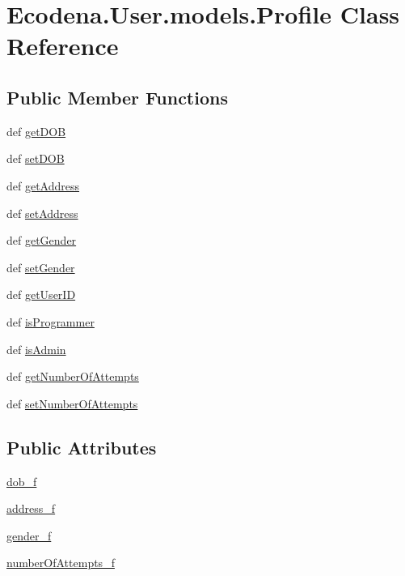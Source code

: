 \hypertarget{class_ecodena_1_1_user_1_1models_1_1_profile}{
\section{Ecodena.User.models.Profile Class Reference}
\label{d2/de8/class_ecodena_1_1_user_1_1models_1_1_profile}
}
\subsection*{Public Member Functions}
\begin{DoxyCompactItemize}
\item 
def \hyperlink{class_ecodena_1_1_user_1_1models_1_1_profile_aa3fa8f1096c2e8021d3578cde996d0d3}{getDOB}
\item 
def \hyperlink{class_ecodena_1_1_user_1_1models_1_1_profile_a1c2cd895532464835322c8817b84127b}{setDOB}
\item 
def \hyperlink{class_ecodena_1_1_user_1_1models_1_1_profile_adaf43b36f5eb3994724afcf4f0747b5a}{getAddress}
\item 
def \hyperlink{class_ecodena_1_1_user_1_1models_1_1_profile_a0b1ce69feddc9f286e7a5db8ec2d3c70}{setAddress}
\item 
def \hyperlink{class_ecodena_1_1_user_1_1models_1_1_profile_ae3c89f787c9d05d936aa9f546f3000d8}{getGender}
\item 
def \hyperlink{class_ecodena_1_1_user_1_1models_1_1_profile_ad672f792bcdbdea6cfeffc42d40c6a77}{setGender}
\item 
def \hyperlink{class_ecodena_1_1_user_1_1models_1_1_profile_a65c1e9ebd3546e0bb3a5d9406b42c447}{getUserID}
\item 
def \hyperlink{class_ecodena_1_1_user_1_1models_1_1_profile_aa39c57dab77961ae9824af3fc8826063}{isProgrammer}
\item 
def \hyperlink{class_ecodena_1_1_user_1_1models_1_1_profile_a3891c38be9cd69cbeaf70ebbb6f64f06}{isAdmin}
\item 
def \hyperlink{class_ecodena_1_1_user_1_1models_1_1_profile_ad1309d4e82559e7d169721375df7eb47}{getNumberOfAttempts}
\item 
def \hyperlink{class_ecodena_1_1_user_1_1models_1_1_profile_aad5024beeaa9c50b58d9d00c64b0c776}{setNumberOfAttempts}
\end{DoxyCompactItemize}
\subsection*{Public Attributes}
\begin{DoxyCompactItemize}
\item 
\hyperlink{class_ecodena_1_1_user_1_1models_1_1_profile_aa1c680ce4e197bcf65844505c0ab5784}{dob\_\-f}
\item 
\hyperlink{class_ecodena_1_1_user_1_1models_1_1_profile_a5229e8c6e894361d0390b975d4cbdee9}{address\_\-f}
\item 
\hyperlink{class_ecodena_1_1_user_1_1models_1_1_profile_ab7dfd7be58c62bacb3fdeef5fcf5477e}{gender\_\-f}
\item 
\hyperlink{class_ecodena_1_1_user_1_1models_1_1_profile_a325bcac723862d8a41a83b45b2de5afa}{numberOfAttempts\_\-f}
\end{DoxyCompactItemize}

